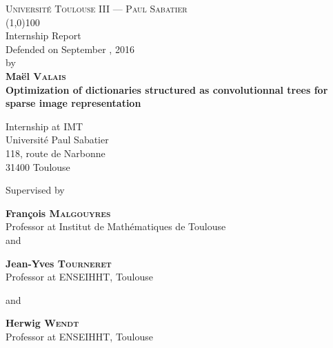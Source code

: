 \begin{titlepage}
\thispagestyle{titlepage}
\begin{center}
\textsc{Université Toulouse III — Paul Sabatier}\\
\vspace{0.5 cm}
\line(1,0){100}\\
\vspace{0.6 cm}
{{{Internship Report}}}\\
\vspace{0.3cm}
Defended on September , 2016\\ \vspace{0.3 cm} by\\ \vspace{0.3 cm} \textbf{Maël \textsc{Valais}}\\
\vfill
{\Huge \textbf{Optimization of dictionaries structured as convolutionnal trees for sparse image representation }}\\
\vfill

{{Internship at \acs{IMT}}}\\
{Université Paul Sabatier}\\
{118, route de Narbonne}\\
{31400 Toulouse}\\
\vspace{2 cm}

\par Supervised by
\vspace{0.5cm}
\par \textbf{François \textsc{Malgouyres}}\\
Professor at Institut de Mathématiques de Toulouse\\ 

\vspace{0.2cm} and \vspace{0.2cm}

\textbf{Jean-Yves \textsc{Tourneret}}\\
Professor at ENSEIHHT, Toulouse

\vspace{0.2cm} and \vspace{0.2cm}

\textbf{Herwig \textsc{Wendt}}\\
Professor at ENSEIHHT, Toulouse

\end{center}
\end{titlepage}

\pagestyle{empty}
\restoregeometry

\tableofcontents


\pagestyle{body}
